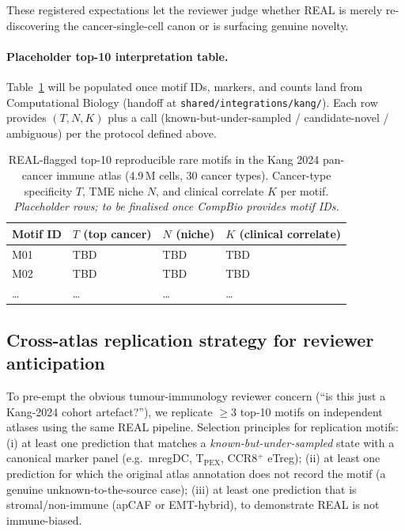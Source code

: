 These registered expectations let the reviewer judge whether REAL is merely re-discovering the cancer-single-cell canon or is surfacing genuine novelty.

\paragraph{Placeholder top-10 interpretation table.}
Table~\ref{tab:kang-topmotifs} will be populated once motif IDs, markers, and counts land from Computational Biology (handoff at \texttt{shared/integrations/kang/}). Each row provides $(T, N, K)$ plus a call (known-but-under-sampled / candidate-novel / ambiguous) per the protocol defined above.

\begin{table}[h]
\small
\caption{REAL-flagged top-10 reproducible rare motifs in the Kang 2024 pan-cancer immune atlas (4.9\,M cells, 30 cancer types). Cancer-type specificity $T$, TME niche $N$, and clinical correlate $K$ per motif. \emph{Placeholder rows; to be finalised once CompBio provides motif IDs.}}
\label{tab:kang-topmotifs}
\begin{tabular}{p{}p{}p{}p{}}
\toprule
Motif ID & $T$ (top cancer) & $N$ (niche) & $K$ (clinical correlate) \\
\midrule
M01 & TBD & TBD & TBD \\
M02 & TBD & TBD & TBD \\
\ldots & \ldots & \ldots & \ldots \\
\bottomrule
\end{tabular}
\end{table}

\subsection{Cross-atlas replication strategy for reviewer anticipation}
\label{sec:kang-replication}

To pre-empt the obvious tumour-immunology reviewer concern (``is this just a Kang-2024 cohort artefact?''), we replicate $\ge 3$ top-10 motifs on independent atlases using the same REAL pipeline. Selection principles for replication motifs: (i) at least one prediction that matches a \emph{known-but-under-sampled} state with a canonical marker panel (e.g.\ mregDC, T$_\text{PEX}$, CCR8$^+$ eTreg); (ii) at least one prediction for which the original atlas annotation does not record the motif (a genuine unknown-to-the-source case); (iii) at least one prediction that is stromal/non-immune (apCAF or EMT-hybrid), to demonstrate REAL is not immune-biased.

